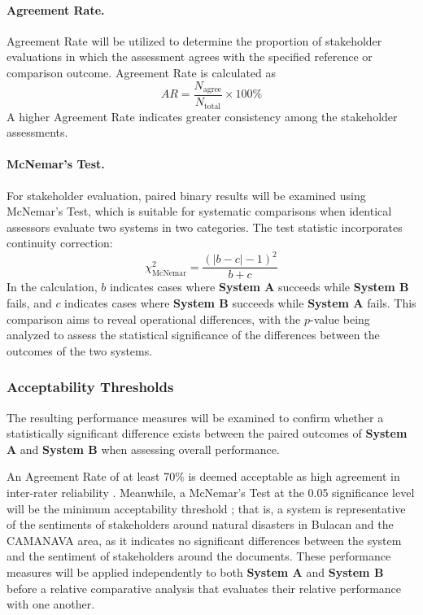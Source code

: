 \documentclass[12pt,a4paper]{report}
\newcommand{\sysA}{\textbf{System A}}
\newcommand{\sysB}{\textbf{System B}}
\begin{document}
\paragraph{Agreement Rate.} Agreement Rate will be utilized to determine the
proportion of stakeholder evaluations in which the assessment agrees with the
specified reference or comparison outcome. Agreement Rate is calculated as
\begin{equation}
  AR = \frac{N_{\text{agree}}}{N_{\text{total}}} \times 100\%
  \label{eq:agreement}
\end{equation}
A higher Agreement Rate indicates greater consistency among the stakeholder
assessments.

\paragraph{McNemar's Test.} For stakeholder evaluation, paired binary results
will be examined using McNemar's Test, which is suitable for systematic
comparisons when identical assessors evaluate two systems in two categories.
The test statistic incorporates continuity correction:
\begin{equation}
  \chi^2_{\text{McNemar}} = \frac{\left(\lvert b - c \rvert - 1\right)^2}{b + c}
  \label{eq:mcnemar}
\end{equation}
In the calculation, $b$ indicates cases where \sysA{} succeeds while \sysB{}
fails, and $c$ indicates cases where \sysB{} succeeds while \sysA{} fails. This
comparison aims to reveal operational differences, with the $p$-value being
analyzed to assess the statistical significance of the differences between the
outcomes of the two systems.

\subsubsection{Acceptability Thresholds}

The resulting performance measures will be examined to confirm whether a
statistically significant difference exists between the paired outcomes of
\sysA{} and \sysB{} when assessing overall performance.

An Agreement Rate of at least 70\% is deemed acceptable as high agreement in
inter-rater reliability \parencite{stemler2004}. Meanwhile, a McNemar's Test at the
0.05 significance level will be the minimum acceptability threshold
\parencite{mcp2025}; that is, a system is representative of the sentiments of
stakeholders around natural disasters in Bulacan and the CAMANAVA area, as it
indicates no significant differences between the system and the sentiment of
stakeholders around the documents. These performance measures will be applied
independently to both \sysA{} and \sysB{} before a relative comparative
analysis that evaluates their relative performance with one another.
\end{document}
